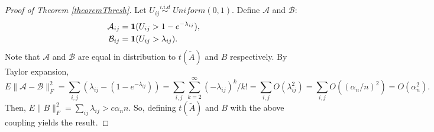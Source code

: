 \documentclass[twoside,11pt]{article}
\begin{document}
\begin{proof}[Proof of Theorem \ref{theoremThresh}]
Let $U_{ij} \overset{i.i.d}{\sim}$ $Uniform(0,1)$. Define $\mathcal{A}$ and $\mathcal{B}$: 
\begin{align*}
\mathcal{A}_{ij} &= \bold{1}(U_{ij}>1-e^{-\lambda_{ij}}),\\
\mathcal{B}_{ij} &= \bold{1}(U_{ij}>\lambda_{ij}).
\end{align*}
Note that $\mathcal{A}$ and $\mathcal{B}$ are equal in distribution to $ t(\tilde A)$ and $B$ respectively.  By Taylor expansion,
\[E\|\mathcal{A} - \mathcal{B}\|^2_F = \sum_{i,j}(\lambda_{ij}-(1-e^{-\lambda_{ij}})) =  \sum_{i,j} \sum_{k=2}^\infty (-\lambda_{ij})^k/k! =  \sum_{i,j} O(\lambda_{ij}^2) =  \sum_{i,j} O((\alpha_n/n)^2) =  O(\alpha_n^2).\]
Then, $E\|B\|_F^2  = \sum_{ij} \lambda_{ij} > c \alpha_n n $.  So, defining $t(\tilde A)$ and $B$ with the above coupling yields the result.

\end{proof}
\end{document}

